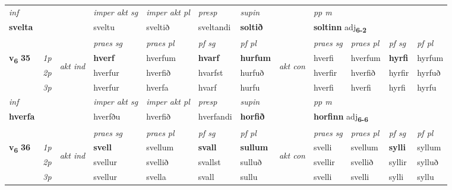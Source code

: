 \begin{longtable}[l]{X>{\footnotesize\itshape}llXXXXlXXXX}
   {\textit{inf}} & &  & \textit{imper akt sg} & \textit{imper akt pl}   & \textit{presp} & \textit{supin}  && \textit{pp m} \\*
  {\textbf{svelta}} & && sveltu  & sveltið   & sveltandi &  \textbf{soltið}  && \multicolumn{2}{l}{\textbf{soltinn} adj\textbf{\textsubscript{6-2}}} \\*

\midrule

 & &   & \textit{praes sg}  & \textit{praes pl}    & \textit{ pf sg} & \textit{pf pl} & & \textit{praes sg}  & \textit{praes pl}    & \textit{pf sg} & \textit{pf pl }  \\ \cmidrule{4-7} \cmidrule{9-12}
 \multirow{2}{*}{{{\textbf{v{\textsubscript{6}}} \Large{\textbf{35}}}}}  & 1p & \multirow{3}{*}{\begin{turn}{90}\textit{akt ind}\end{turn}} & \textbf{hverf} & hverfum & \textbf{hvarf} & \textbf{hurfum} & \multirow{3}{*}{\begin{turn}{90}\textit{akt con}\end{turn}} &hverfi & hverfum & \textbf{hyrfi} & hyrfum\\*
 & 2p &  &  hverfur  & hverfið & hvarfst & hurfuð & & hverfir & hverfið & hyrfir & hyrfuð \\*
 & 3p &  & hverfur & hverfa & hvarf & hurfu & & hverfi & hverfi& hyrfi & hyrfu \\*
\cmidrule{4-7} \cmidrule{9-12}

   {\textit{inf}} & &  & \textit{imper akt sg} & \textit{imper akt pl}   & \textit{presp} & \textit{supin}  && \textit{pp m} \\*
  {\textbf{hverfa}} & && hverfðu  & hverfið   & hverfandi &  \textbf{horfið}  && \multicolumn{2}{l}{\textbf{horfinn} adj\textbf{\textsubscript{6-6}}} \\*

\midrule

 & &   & \textit{praes sg}  & \textit{praes pl}    & \textit{ pf sg} & \textit{pf pl} & & \textit{praes sg}  & \textit{praes pl}    & \textit{pf sg} & \textit{pf pl }  \\ \cmidrule{4-7} \cmidrule{9-12}
 \multirow{2}{*}{{{\textbf{v{\textsubscript{6}}} \Large{\textbf{36}}}}}  & 1p & \multirow{3}{*}{\begin{turn}{90}\textit{akt ind}\end{turn}} & \textbf{svell} & svellum & \textbf{svall} & \textbf{sullum} & \multirow{3}{*}{\begin{turn}{90}\textit{akt con}\end{turn}} &svelli & svellum & \textbf{sylli} & syllum\\*
 & 2p &  &  svellur  & svellið & svallst & sulluð & & svellir & svellið & syllir & sylluð \\*
 & 3p &  & svellur & svella & svall & sullu & & svelli & svelli& sylli & syllu \\*
\cmidrule{4-7} \cmidrule{9-12}


\end{longtable}
